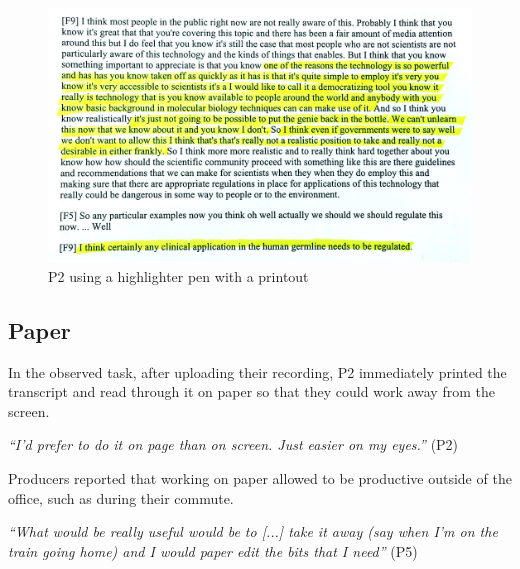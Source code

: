 


\begin{figure}[t]
\centering
  \includegraphics[width=\columnwidth]{figs/highlighting-cropped.jpg}
  \caption{P2 using a highlighter pen with a printout}
  \label{fig:highlight}
\end{figure}

\subsection{Paper}
In the observed task, after uploading their recording, P2 immediately printed
the transcript and read through it on paper so that they could work away from
the screen.

\textit{``I'd prefer to do it on page than on screen. Just easier on my
  eyes.''} (P2)

Producers reported that working on paper allowed to be productive outside of
the office, such as during their commute.

\textit{``What would be really useful would be to [...] take it away (say when
  I'm on the train going home) and I would paper edit the bits that I need''}
(P5)

